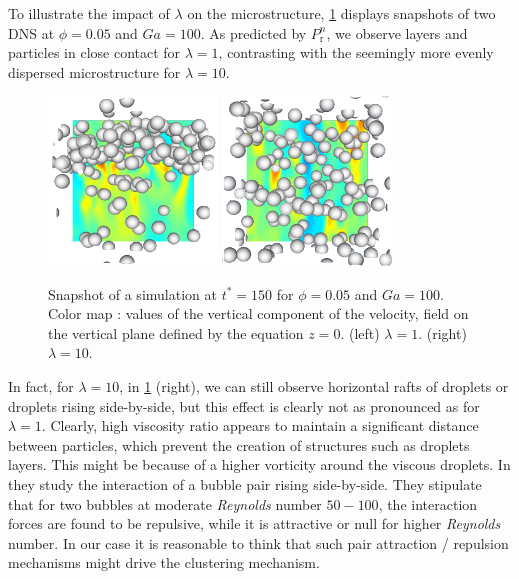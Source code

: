 To illustrate the impact of $\lambda$ on the microstructure, \ref{fig:images} displays snapshots of two DNS at $\phi = 0.05$ and $Ga = 100$. 
As predicted by $P_\text{r}^n$, we observe layers and particles in close contact for $\lambda = 1$, contrasting with the seemingly more evenly dispersed microstructure for $\lambda = 10$.
\begin{figure}[h!]
    \centering
    \includegraphics[width=0.4\textwidth]{image/HOMOGENEOUS_NEW/P_PHI_5_l_10_Ga_100.png}
    \includegraphics[width=0.4\textwidth]{image/HOMOGENEOUS_NEW/P_PHI_5_l_1_Ga_100.png}
    \caption{Snapshot of a simulation at $t^* = 150$ for $\phi=0.05$ and $Ga=100$.
    Color map : values of the vertical component of the velocity, field on the vertical plane defined by the equation $z=0$. 
    (left)  $\lambda = 1$.
    (right)  $\lambda = 10$.
    }
    \label{fig:images}
\end{figure}
In fact, for $\lambda = 10$, in \ref{fig:images} (right), we can still  observe horizontal rafts of droplets or droplets rising side-by-side, but this effect is clearly not as pronounced as for $\lambda = 1$. 
Clearly, high viscosity ratio appears to maintain a significant distance between particles, which prevent the creation of structures such as droplets layers.
This might be because of a higher vorticity around the viscous droplets.   
In \citet{legendre2003hydrodynamic} they study the interaction of a bubble pair rising side-by-side. 
They stipulate that for two bubbles at moderate \textit{Reynolds} number $50-100$, the interaction forces are found to be repulsive, while it is attractive or null for higher \textit{Reynolds} number. 
In our case it is reasonable to think that such pair attraction / repulsion mechanisms might drive the clustering mechanism.


